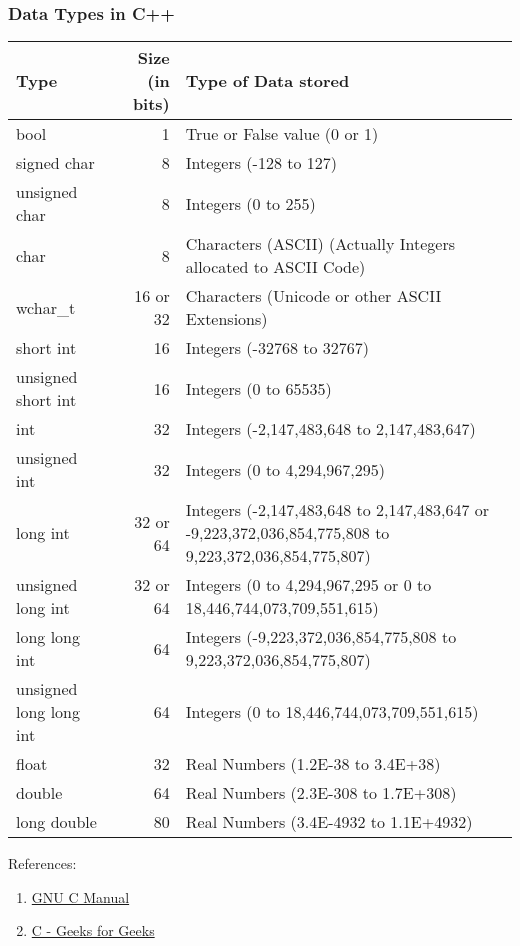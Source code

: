\documentclass[12pt,a4paper]{article}
\begin{document}
\subsubsection{Data Types in C++}

\begin{tabular}{|l|r|p{9cm}|}
	\hline
	Type & Size (in bits) & Type of Data stored\\
	\hline
	bool & 1 & True or False value (0 or 1)\\
	signed char & 8 & Integers (-128 to 127)\\
	unsigned char & 8 & Integers (0 to 255)\\
	char & 8 & Characters (ASCII) (Actually Integers allocated to ASCII Code)\\
	wchar\_t & 16 or 32 & Characters (Unicode or other ASCII Extensions)\\
	short int & 16 & Integers (-32768 to 32767)\\
	unsigned short int & 16 & Integers (0 to 65535)\\
	int & 32 & Integers (-2,147,483,648 to 2,147,483,647)\\
	unsigned int & 32 & Integers (0 to 4,294,967,295)\\
	long int & 32 or 64 & Integers (-2,147,483,648 to 2,147,483,647 or -9,223,372,036,854,775,808 to 9,223,372,036,854,775,807)\\
	unsigned long int & 32 or 64 & Integers (0 to 4,294,967,295 or 0 to 18,446,744,073,709,551,615)\\
	long long int & 64 & Integers (-9,223,372,036,854,775,808 to 9,223,372,036,854,775,807)\\
	unsigned long long int & 64 & Integers (0 to 18,446,744,073,709,551,615)\\
	float & 32 & Real Numbers (1.2E-38 to 3.4E+38)\\
	double & 64 & Real Numbers (2.3E-308 to 1.7E+308)\\
	long double & 80 & Real Numbers (3.4E-4932 to 1.1E+4932)\\
	\hline
\end{tabular}

References: 

\begin{enumerate}
	\item \href{https://www.gnu.org/software/gnu-c-manual/gnu-c-manual.html}{GNU C Manual}
	\item \href{https://www.geeksforgeeks.org/c-data-types/}{C - Geeks for Geeks}
\end{enumerate}
\end{document}
